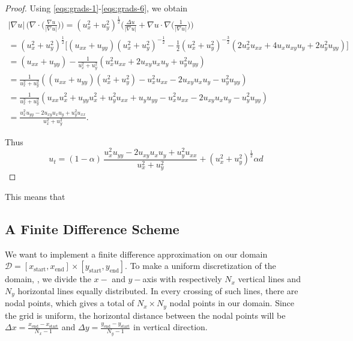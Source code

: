 \begin{proof}
Using \eqref{eqs:grads-1}-\eqref{eqs:grads-6}, we obtain
\begin{equation*}
    \begin{gathered}
        |\nabla u|\, \bigg(\nabla \cdot \bigg(\frac{\nabla u}{|\nabla u|}\bigg)\bigg)
        = (u_x ^2 + u_y ^2)^{\frac{1}{2}} \bigg( \frac{\Delta u}{|\nabla u|} + \nabla u \cdot \nabla \bigg(\frac{1}{|\nabla u|} \bigg) \bigg) \\
        = (u_x ^2 + u_y ^2)^{\frac{1}{2}} \bigg[ (u_{xx} + u_{yy}) (u_x ^2 + u_y ^2)^{-\frac{1}{2}} - \frac{1}{2} (u_x ^2 + u_y ^2)^{-\frac{3}{2}} (2u_x^2u_{xx}+4u_x u_{xy} u_y + 2u_y^2 u_{yy})\bigg] \\
        = (u_{xx} + u_{yy}) - \frac{1}{u_x^2+u_y^2} (u_x^2 u_{xx}+2u_{xy} u_x u_y + u_y^2 u_{yy}) \\
        = \frac{1}{u_x^2+u_y^2} ( (u_{xx} + u_{yy})(u_x^2 + u_y^2) - u_x^2 u_{xx}-2u_{xy} u_x u_y - u_y^2 u_{yy}) \\
        = \frac{1}{u_x^2+u_y^2}(u_{xx}u_x^2 + u_{yy}u_x^2 + u_y^2u_{xx}+ u_y u_{yy}-u_x^2 u_{xx}-2u_{xy} u_x u_y - u_y^2 u_{yy}) \\
        = \frac{u_x^2u_{yy} - 2u_{xy}u_xu_y + u_y^2u_{xx}}{u_x^2+u_y^2}.
    \end{gathered}
\end{equation*}

Thus 
\begin{equation*}
    u_t =(1-\alpha)\, \frac{u_x^2 u_{yy} - 2 u_{xy} u_x u_y + u_y^2u_{xx}}{u_x^2 + u_y^2} + (u_x^2 + u_y^2)^{\frac{1}{2}}\alpha d
\end{equation*}
\end{proof}

This means that 

\subsection*{A Finite Difference Scheme}
We want to implement a finite difference approximation on our domain $\mathcal{D} = [x_{\text{start}}, x_{\text{end}}]\times[y_{\text{start}}, y_{\text{end}}]$. To make a uniform discretization of the domain, \domain, we divide the $x-$ and $y-$axis with respectively $N_x$ vertical lines and $N_y$ horizontal lines equally distributed. In every crossing of such lines, there are nodal points, which gives a total of $N_x\times N_y$ nodal points in our domain. Since the grid is uniform, the horizontal distance between the nodal points will be $\Delta x = \frac{x_{\text{end}} - x_{\text{start}}}{N_x-1}$ and $\Delta y = \frac{y_{\text{end}} - y_{\text{start}}}{N_y-1}$ in vertical direction. 

